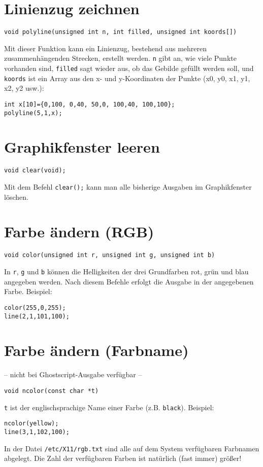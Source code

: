 \documentclass{article}
\begin{document}
\section{Linienzug zeichnen}
\begin{verbatim}
void polyline(unsigned int n, int filled, unsigned int koords[])
\end{verbatim}
Mit dieser Funktion kann ein Linienzug, bestehend aus mehreren
zusammenh\"angenden Strecken, erstellt werden.
\verb_n_ gibt an, wie viele Punkte vorhanden sind, \verb_filled_ sagt wieder
aus, ob das Gebilde gef\"ullt werden soll, und
\verb_koords_ ist ein Array aus den x- und y-Koordinaten der Punkte
(x0, y0, x1, y1, x2, y2 usw.):
\begin{verbatim}
int x[10]={0,100, 0,40, 50,0, 100,40, 100,100};
polyline(5,1,x);
\end{verbatim}
\section{Graphikfenster leeren}
\begin{verbatim}
void clear(void);
\end{verbatim}
Mit dem Befehl \verb_clear();_ kann man alle bisherige 
Ausgaben im Graphikfenster l\"oschen.
\section{Farbe \"andern (RGB)}
\begin{verbatim}
void color(unsigned int r, unsigned int g, unsigned int b)
\end{verbatim}
In \verb_r_, \verb_g_ und \verb_b_ k\"onnen die Helligkeiten der drei Grundfarben
rot, gr\"un und blau angegeben werden. Nach diesem Befehle erfolgt
die Ausgabe in der angegebenen Farbe. Beispiel:
\begin{verbatim}
color(255,0,255);
line(2,1,101,100);
\end{verbatim}
\section{Farbe \"andern (Farbname)}
-- nicht bei Ghostscript-Ausgabe verf\"ugbar --
\begin{verbatim}
void ncolor(const char *t)
\end{verbatim}
\verb_t_ ist der englischsprachige Name einer Farbe
(z.B. \verb_black_). Beispiel:
\begin{verbatim}
ncolor(yellow);
line(3,1,102,100);
\end{verbatim}
In der Datei \verb_/etc/X11/rgb.txt_ sind
alle auf dem System verf\"ugbaren Farbnamen
abgelegt. Die Zahl der verf\"ugbaren Farben
ist nat\"urlich (fast immer) gr\"o\ss{}er!
\end{document}
